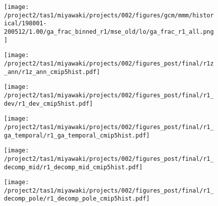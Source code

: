 \documentclass{ametsocV5}
\begin{document}
\begin{figure}[t]
  \noindent\texttt{[image: /project2/tas1/miyawaki/projects/002/figures/gcm/mmm/historical/198001-200512/1.00/ga\_frac\_binned\_r1/mse\_old/lo/ga\_frac\_r1\_all.png]}\\
  \label{fig:cmip5-binned-r1}
\end{figure}

\begin{figure}[t]
  \noindent\texttt{[image: /project2/tas1/miyawaki/projects/002/figures\_post/final/r1z\_ann/r1z\_ann\_cmip5hist.pdf]}\\
  \label{fig:cmip5hist-r1-ann}
\end{figure}

\begin{figure}[t]
  \noindent\texttt{[image: /project2/tas1/miyawaki/projects/002/figures\_post/final/r1\_dev/r1\_dev\_cmip5hist.pdf]}\\
  \label{fig:cmip5hist-r1-dev}
\end{figure}

\begin{figure}[t]
  \noindent\texttt{[image: /project2/tas1/miyawaki/projects/002/figures\_post/final/r1\_ga\_temporal/r1\_ga\_temporal\_cmip5hist.pdf]}\\
  \label{fig:cmip5hist-r1-ga-temporal}
\end{figure}

\begin{figure}[t]
  \noindent\texttt{[image: /project2/tas1/miyawaki/projects/002/figures\_post/final/r1\_decomp\_mid/r1\_decomp\_mid\_cmip5hist.pdf]}\\
  \label{fig:cmip5hist-r1-decomp-mid}
\end{figure}

\begin{figure}[t]
  \noindent\texttt{[image: /project2/tas1/miyawaki/projects/002/figures\_post/final/r1\_decomp\_pole/r1\_decomp\_pole\_cmip5hist.pdf]}\\
  \label{fig:cmip5hist-r1-decomp-pole}
\end{figure}
\end{document}
